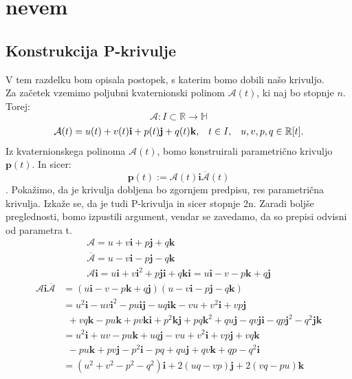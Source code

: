 \documentclass[mat1]{fmfdelo}
\newcommand{\R}{\mathbb R}
\newcommand{\HH}{\mathbb H}
\newcommand{\ii}{\boldsymbol i}
\newcommand{\jj}{\boldsymbol j}
\newcommand{\kk}{\boldsymbol k}
\begin{document}
\section{nevem}
\subsection{Konstrukcija P-krivulje}
V tem razdelku bom opisala postopek, s katerim bomo dobili našo krivuljo.\\
Za začetek vzemimo poljubni kvaternionski polinom $\mathcal{A}(t)$, ki naj bo stopnje $n$. Torej:
\begin{equation*}
\mathcal{A}: I \subset \R \rightarrow \HH
\end{equation*}
\begin{equation*}
\begin{array}{c c c}
\mathcal{A}(t) = u(t) + v(t) \mathbf{i} + p(t) \mathbf{j} + q(t) \mathbf{k}, & t \in I,& u,v,p,q \in \R[t].
\end{array}
\end{equation*}
Iz kvaternionskega polinoma $\mathcal{A}(t)$, bomo konstruirali parametrično krivuljo $\mathbf{p}(t)$. In sicer:
\begin{equation}
\boldsymbol{p}(t) := \mathcal{A}(t) \boldsymbol{i} \overline{\mathcal{A}}(t)
\end{equation}.
Pokažimo, da je krivulja dobljena bo zgornjem predpisu, res parametrična krivulja. Izkaže se, da je tudi P-krivulja in sicer stopnje 2n. Zaradi boljše preglednosti, bomo izpustili argument, vendar se zavedamo, da so prepisi odvisni od parametra t.
\begin{equation*}
\begin{array}{c}
\mathcal{A} = u + v\boldsymbol{i} + p \boldsymbol{j} + q \boldsymbol{k}  \\
\overline{\mathcal{A}} = u - v\boldsymbol{i} - p \boldsymbol{j} - q \boldsymbol{k}  \\
\mathcal{A} \boldsymbol{i} = u \boldsymbol{i} + v \boldsymbol{i}^2 + p \boldsymbol{ji} + q\boldsymbol{ki} =  u \boldsymbol{i} - v - p \boldsymbol{k} + q\boldsymbol{j}	
\end{array} 
\end{equation*}
\begin{equation*}
\begin{split}
\mathcal{A}\boldsymbol{i}\overline{\mathcal{A}} & =(u\boldsymbol{i}-v-p\boldsymbol{k}+q\boldsymbol{j})(u-v\boldsymbol{i}-p\boldsymbol{j}-q\boldsymbol{k}) \\
&= u^2 \ii -uv\ii^2-pu\ii\jj - uq\ii\kk - vu + v^2\ii + vp\jj\\
&~~ +vq\kk - pu\kk + pv\kk\ii + p^2 \kk\jj + pq\kk^2 + qu\jj - qv\jj\ii - qp\jj^2 -q^2\jj\kk \\
& = u^2\ii + uv - pu\kk + uq\jj -vu+v^2\ii +vp\jj + vq\kk \\
& ~~-pu\kk+pv\jj-p^2\ii-pq+qu\jj+qv\kk+qp-q^2\ii \\
& = (u^2+v^2-p^2-q^2)\ii + 2(uq-vp)\jj +2(vq-pu)\kk
\end{split}
\end{equation*}
\end{document}
